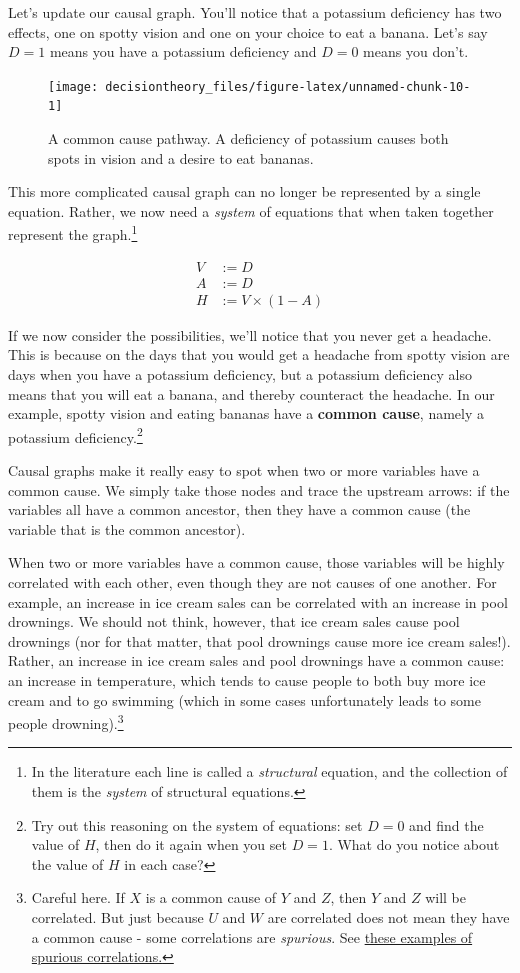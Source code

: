 \documentclass[]{tufte-book}
\begin{document}
Let's update our causal graph. You'll notice that a potassium deficiency has two effects, one on spotty vision and one on your choice to eat a banana. Let's say \(D=1\) means you have a potassium deficiency and \(D=0\) means you don't.

\begin{figure}
\texttt{[image: decisiontheory\_files/figure-latex/unnamed-chunk-10-1]} \caption[A common cause pathway]{A common cause pathway. A deficiency of potassium causes both spots in vision and a desire to eat bananas.}\label{fig:unnamed-chunk-10}
\end{figure}

This more complicated causal graph can no longer be represented by a single equation. Rather, we now need a \emph{system} of equations that when taken together represent the graph.\footnote{In the literature each line is called a \emph{structural} equation, and the collection of them is the \emph{system} of structural equations.}

\[
\begin{aligned}
V &:= D\\
A &:= D \\
H &:= V\times(1-A)
\end{aligned}
\]

If we now consider the possibilities, we'll notice that you never get a headache. This is because on the days that you would get a headache from spotty vision are days when you have a potassium deficiency, but a potassium deficiency also means that you will eat a banana, and thereby counteract the headache. In our example, spotty vision and eating bananas have a \textbf{common cause}, namely a potassium deficiency.\footnote{Try out this reasoning on the system of equations: set \(D=0\) and find the value of \(H\), then do it again when you set \(D=1\). What do you notice about the value of \(H\) in each case?}

Causal graphs make it really easy to spot when two or more variables have a common cause. We simply take those nodes and trace the upstream arrows: if the variables all have a common ancestor, then they have a common cause (the variable that is the common ancestor).

When two or more variables have a common cause, those variables will be highly correlated with each other, even though they are not causes of one another. For example, an increase in ice cream sales can be correlated with an increase in pool drownings. We should not think, however, that ice cream sales cause pool drownings (nor for that matter, that pool drownings cause more ice cream sales!). Rather, an increase in ice cream sales and pool drownings have a common cause: an increase in temperature, which tends to cause people to both buy more ice cream and to go swimming (which in some cases unfortunately leads to some people drowning).\footnote{Careful here. If \(X\) is a common cause of \(Y\) and \(Z\), then \(Y\) and \(Z\) will be correlated. But just because \(U\) and \(W\) are correlated does not mean they have a common cause - some correlations are \emph{spurious}. See \href{https://www.tylervigen.com/spurious-correlations}{these examples of spurious correlations.}}
\end{document}
